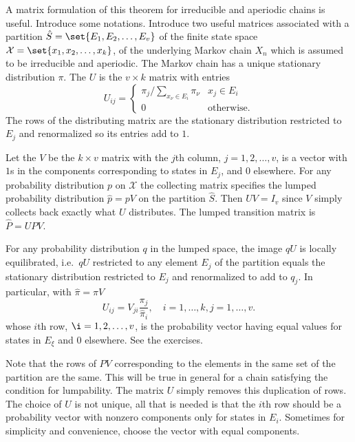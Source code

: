 \documentclass[12pt]{article}
\begin{document}
A matrix formulation of this theorem for irreducible and aperiodic
chains is useful.  Introduce some notations.  Introduce two useful
matrices associated with a
partition \( \hat{S} = \set{E_1, E_2, \dots, E_v} \) of the finite state
space \( \mathcal{X} = \set{x_1, x_2, \dots, x_k} \), of the underlying
Markov chain \( X_n \) which is assumed to be irreducible and
aperiodic.  The Markov chain has a unique stationary
distribution \( \pi \).  The %
\( U \) is the \( v \times k \) matrix with entries
\[
    U_{ij} =
    \begin{cases}
        \pi_j/\sum_{x_{\nu} \in E_i} \pi_\nu & x_j \in E_i \\
        0 & \text{otherwise}.
    \end{cases}
\] The rows of the distributing matrix are the stationary distribution
restricted to \( E_j \) and renormalized so its entries add to \( 1 \).

Let the %
\( V \) be the \( k \times v \) matrix with the \( j \)th column, \( j =
1, 2, \dots, v \), is a vector with \( 1 \)s in the components
corresponding to states in \( E_j \), and \( 0 \) elsewhere.  For any
probability distribution \( p \) on \( \mathcal{X} \) the collecting
matrix specifies the lumped probability distribution \( \hat{p} = p V \)
on the partition \( \hat{S} \).  Then \( UV = I_v \) since \( V \)
simply collects back exactly what \( U \) distributes.  The lumped
transition matrix is \( \hat{P} = UPV \).

For any probability distribution \( q \) in the lumped space, the image \(
qU \) is locally equilibrated, i.e.\ \( qU \) restricted to any element \(
E_j \) of the partition equals the stationary distribution restricted to
\( E_j \) and renormalized to add to \( q_j \).  In particular, with \(
\hat{\pi} = \pi V \)
\[
    U_{ij} = V_{ji} \frac{\pi_j}{\hat{\pi}_{i}}, \quad i = 1, \dots, k,
    j = 1, \dots, v.
\] whose \( i \)th row, \( \i = 1, 2, \dots, v \), is the probability
vector having equal values for states in \( E_{\xi} \) and \( 0 \)
elsewhere.  See the exercises.

Note that the rows of \( PV \) corresponding to the elements in the same
set of the partition are the same.  This will be true in general for a
chain satisfying the condition for lumpability.  The matrix \( U \)
simply removes this duplication of rows.  The choice of \( U \) is not
unique, all that is needed is that the \( i \)th row should be a
probability vector with nonzero components only for states in \( E_i \).
Sometimes for simplicity and convenience, choose the vector with equal
components.
\end{document}
